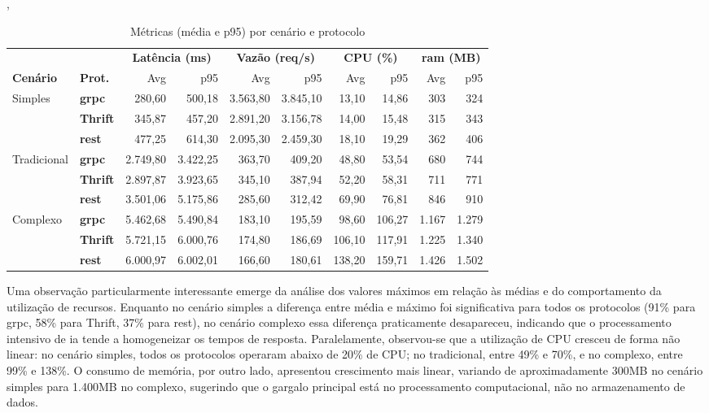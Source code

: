 \begin{table}[H]
\centering
\caption{Métricas (média e p95) por cenário e protocolo}
\label{tab:res_todos_agrupados},
\setlength{\tabcolsep}{4pt}
\renewcommand{\arraystretch}{1.15}
\begin{tabularx}{\linewidth}{l X | r | r | r | r | r | r | r | r |}
\hline
\multicolumn{2}{c}{} & \multicolumn{2}{c}{\textbf{Latência (ms)}} & \multicolumn{2}{c}{\textbf{Vazão (req/s)}} & \multicolumn{2}{c}{\textbf{CPU (\%)}} & \multicolumn{2}{c}{\textbf{\acrshort{ram} (MB)}} \\
\cline{3-10}
\textbf{Cenário} & \textbf{Prot.} & Avg & p95 & Avg & p95 & Avg & p95 & Avg & p95 \\
\hline
\multirow{3}{*}{Simples}
  & \textbf{\acrshort{grpc}}   & 280,60   & 500,18   & 3.563,80 & 3.845,10 & 13,10  & 14,86  & 303   & 324  \\
  & \textbf{Thrift} & 345,87   & 457,20   & 2.891,20 & 3.156,78 & 14,00  & 15,48  & 315   & 343  \\
  & \textbf{\gls{rest}}   & 477,25   & 614,30   & 2.095,30 & 2.459,30 & 18,10  & 19,29  & 362   & 406  \\
\hline
\multirow{3}{*}{Tradicional}
  & \textbf{\acrshort{grpc}}   & 2.749,80 & 3.422,25 & 363,70   & 409,20   & 48,80  & 53,54  & 680   & 744  \\
  & \textbf{Thrift} & 2.897,87 & 3.923,65 & 345,10   & 387,94   & 52,20  & 58,31  & 711   & 771  \\
  & \textbf{\gls{rest}}   & 3.501,06 & 5.175,86 & 285,60   & 312,42   & 69,90  & 76,81  & 846   & 910  \\
\hline
\multirow{3}{*}{Complexo}
  & \textbf{\acrshort{grpc}}   & 5.462,68 & 5.490,84 & 183,10   & 195,59   & 98,60  & 106,27 & 1.167 & 1.279 \\
  & \textbf{Thrift} & 5.721,15 & 6.000,76 & 174,80   & 186,69   & 106,10 & 117,91 & 1.225 & 1.340 \\
  & \textbf{\gls{rest}}   & 6.000,97 & 6.002,01 & 166,60   & 180,61   & 138,20 & 159,71 & 1.426 & 1.502 \\
\hline
\end{tabularx}
\end{table}

Uma observação particularmente interessante emerge da análise dos valores máximos em relação às médias e do comportamento da utilização de recursos. Enquanto no cenário simples a diferença entre média e máximo foi significativa para todos os protocolos (91\% para \gls{grpc}, 58\% para Thrift, 37\% para \gls{rest}), no cenário complexo essa diferença praticamente desapareceu, indicando que o processamento intensivo de \gls{ia} tende a homogeneizar os tempos de resposta. Paralelamente, observou-se que a utilização de CPU cresceu de forma não linear: no cenário simples, todos os protocolos operaram abaixo de 20\% de CPU; no tradicional, entre 49\% e 70\%, e no complexo, entre 99\% e 138\%. O consumo de memória, por outro lado, apresentou crescimento mais linear, variando de aproximadamente 300MB no cenário simples para 1.400MB no complexo, sugerindo que o gargalo principal está no processamento computacional, não no armazenamento de dados.

